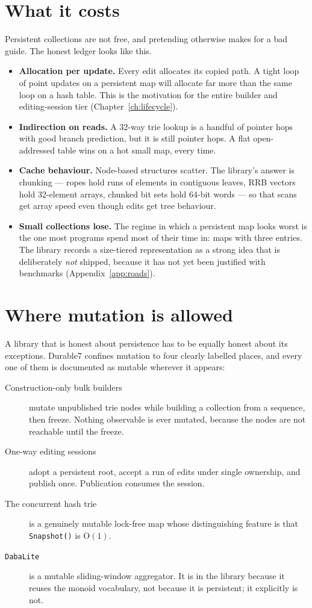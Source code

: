 \documentclass[11pt,twoside,openright]{book}
\newcommand{\code}[1]{\texorpdfstring{\textcolor{d7ink}{\texttt{#1}}}{#1}}
\newcommand{\bigoh}[1]{$\mathrm{O}(#1)$}
\begin{document}
\section{What it costs}

Persistent collections are not free, and pretending otherwise makes for a bad
guide. The honest ledger looks like this.

\begin{itemize}
\item \textbf{Allocation per update.} Every edit allocates its copied path. A
tight loop of point updates on a persistent map will allocate far more than the
same loop on a hash table. This is the motivation for the entire builder and
editing-session tier (Chapter~\ref{ch:lifecycle}).
\item \textbf{Indirection on reads.} A 32-way trie lookup is a handful of
pointer hops with good branch prediction, but it is still pointer hops. A flat
open-addressed table wins on a hot small map, every time.
\item \textbf{Cache behaviour.} Node-based structures scatter. The library's
answer is chunking --- ropes hold runs of elements in contiguous leaves, RRB
vectors hold 32-element arrays, chunked bit sets hold 64-bit words --- so that
scans get array speed even though edits get tree behaviour.
\item \textbf{Small collections lose.} The regime in which a persistent map
looks worst is the one most programs spend most of their time in: maps with
three entries. The library records a size-tiered representation as a strong idea
that is deliberately \emph{not} shipped, because it has not yet been justified
with benchmarks (Appendix~\ref{app:roads}).
\end{itemize}

\section{Where mutation is allowed}

A library that is honest about persistence has to be equally honest about its
exceptions. Durable7 confines mutation to four clearly labelled places, and
every one of them is documented as mutable wherever it appears:

\begin{description}
\item[Construction-only bulk builders] mutate unpublished trie nodes while
building a collection from a sequence, then freeze. Nothing observable is ever
mutated, because the nodes are not reachable until the freeze.
\item[One-way editing sessions] adopt a persistent root, accept a run of edits
under single ownership, and publish once. Publication consumes the session.
\item[The concurrent hash trie] is a genuinely mutable lock-free map whose
distinguishing feature is that \code{Snapshot()} is \bigoh{1}.
\item[\code{DabaLite}] is a mutable sliding-window aggregator. It is in the
library because it reuses the monoid vocabulary, not because it is persistent;
it explicitly is not.
\end{description}
\end{document}
